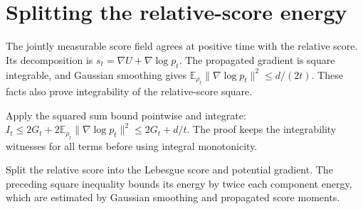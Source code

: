 \documentclass[11pt,a4paper]{article}
\begin{document}
\section{\texorpdfstring{Splitting the relative-score energy}{Splitting the relative-score energy}}


The jointly measurable score field agrees at positive time with the relative score. Its decomposition is \(s_t=\nabla U+\nabla\log p_t\). The propagated gradient is square integrable, and Gaussian smoothing gives \(\mathbb E_{\rho_t}\|\nabla\log p_t\|^2\le d/(2t)\). These facts also prove integrability of the relative-score square.



Apply the squared sum bound pointwise and integrate: \(I_t\le2G_t+2\mathbb E_{\rho_t}\|\nabla\log p_t\|^2\le2G_t+d/t\). The proof keeps the integrability witnesses for all terms before using integral monotonicity.



Split the relative score into the Lebesgue score and potential gradient. The preceding square inequality bounds its energy by twice each component energy, which are estimated by Gaussian smoothing and propagated score moments.
\end{document}
